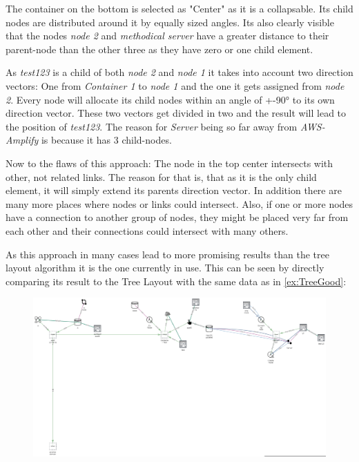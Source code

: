 The container on the bottom is selected as "Center" as it is a collapsable. Its child nodes are distributed around it by equally sized angles. Its also clearly visible that the nodes \emph{node 2} and \emph{methodical server} have a greater distance to their parent-node than the other three as they have zero or one child element.

As \emph{test123} is a child of both \emph{node 2} and \emph{node 1} it takes into account two direction vectors: One from \emph{Container 1} to \emph{node 1} and the one it gets assigned from \emph{node 2}. Every node will allocate its child nodes within an angle of +-90° to its own direction vector. These two vectors get divided in two and the result will lead to the position of \emph{test123}. The reason for \emph{Server} being so far away from \emph{AWS-Amplify} is because it has 3 child-nodes.

Now to the flaws of this approach: The node in the top center intersects with other, not related links. The reason for that is, that as it is the only child element, it will simply extend its parents direction vector.
In addition there are many more places where nodes or links could intersect. Also, if one or more nodes have a connection to another group of nodes, they might be placed very far from each other and their connections could intersect with many others.

As this approach in many cases lead to more promising results than the tree layout algorithm it is the one currently in use. This can be seen by directly comparing its result to the Tree Layout with the same data as in \autoref{ex:TreeGood}:

\begin{figure}[H]
\centering
\includegraphics[scale=.4]{Bilder/FlowerCompTree.png}
\label{ex:ComparisonTreeFlower}
\end{figure}

